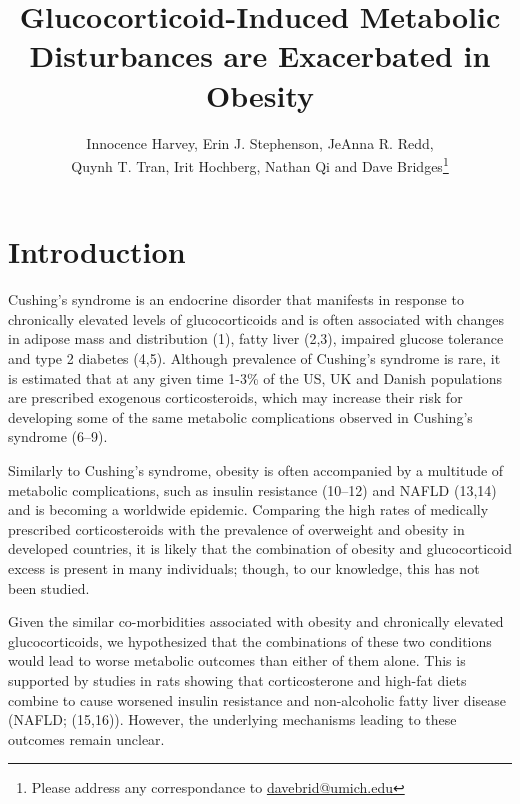 \documentclass[11pt]{article} %
\date{} %
\title{Glucocorticoid-Induced Metabolic Disturbances are Exacerbated in
Obesity}
\author{Innocence Harvey, Erin J. Stephenson, JeAnna R. Redd,\\ Quynh T. Tran,
Irit Hochberg, Nathan Qi and Dave Bridges\footnote{Please address any correspondance to \href{mailto:davebrid@umich.edu}{davebrid@umich.edu}}}
\begin{document}
\maketitle


\section*{Introduction}

Cushing's syndrome is an endocrine disorder that manifests in response
to chronically elevated levels of glucocorticoids and is often
associated with changes in adipose mass and distribution (1), fatty
liver (2,3), impaired glucose tolerance and type 2 diabetes (4,5).
Although prevalence of Cushing's syndrome is rare, it is estimated that
at any given time 1-3\% of the US, UK and Danish populations are
prescribed exogenous corticosteroids, which may increase their risk for
developing some of the same metabolic complications observed in
Cushing's syndrome (6--9).

Similarly to Cushing's syndrome, obesity is often accompanied by a
multitude of metabolic complications, such as insulin resistance
(10--12) and NAFLD (13,14) and is becoming a worldwide epidemic.
Comparing the high rates of medically prescribed corticosteroids with
the prevalence of overweight and obesity in developed countries, it is
likely that the combination of obesity and glucocorticoid excess is
present in many individuals; though, to our knowledge, this has not been
studied.

Given the similar co-morbidities associated with obesity and chronically
elevated glucocorticoids, we hypothesized that the combinations of these
two conditions would lead to worse metabolic outcomes than either of
them alone. This is supported by studies in rats showing that
corticosterone and high-fat diets combine to cause worsened insulin
resistance and non-alcoholic fatty liver disease (NAFLD; (15,16)).
However, the underlying mechanisms leading to these outcomes remain
unclear.
\end{document}
